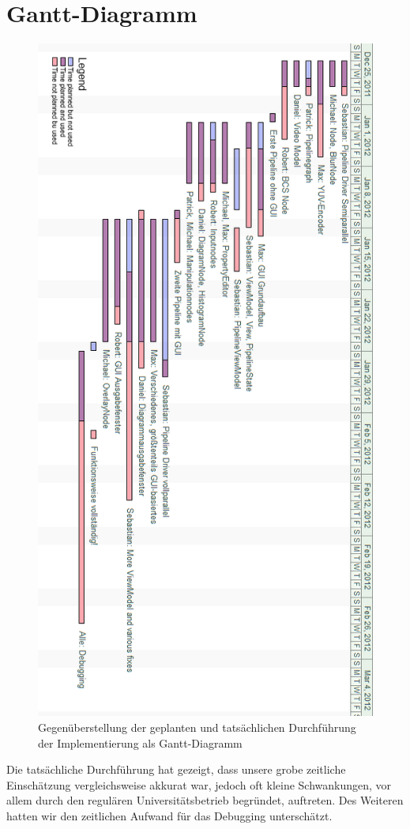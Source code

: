 \section{Gantt-Diagramm}

\begin{figure}[h!]
\begin{center}
\includegraphics[height=0.7\textheight]{ganttOverlay.png}
\end{center}
\caption{Gegenüberstellung der geplanten und tatsächlichen Durchführung der Implementierung als Gantt-Diagramm}
\end{figure}

Die tatsächliche Durchführung hat gezeigt, dass unsere grobe zeitliche Einschätzung vergleichsweise akkurat war, jedoch oft kleine Schwankungen, vor allem durch den regulären Universitätsbetrieb begründet, auftreten. Des Weiteren hatten wir den zeitlichen Aufwand für das Debugging unterschätzt.